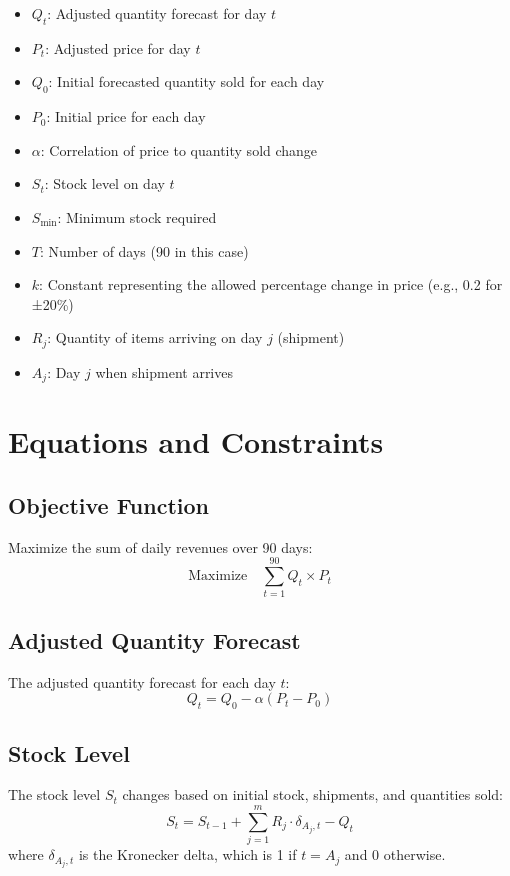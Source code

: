 \documentclass{article}
\begin{document}
\begin{itemize}
  \item $Q_t$: Adjusted quantity forecast for day \( t \)
  \item $P_t$: Adjusted price for day \( t \)
  \item $Q_0$: Initial forecasted quantity sold for each day
  \item $P_0$: Initial price for each day
  \item $\alpha$: Correlation of price to quantity sold change
  \item $S_t$: Stock level on day \( t \)
  \item $S_{\text{min}}$: Minimum stock required
  \item $T$: Number of days (90 in this case)
  \item $k$: Constant representing the allowed percentage change in price (e.g., 0.2 for ±20\%)
  \item $R_j$: Quantity of items arriving on day \( j \) (shipment)
  \item $A_j$: Day \( j \) when shipment arrives
\end{itemize}

\section*{Equations and Constraints}

\subsection*{Objective Function}

Maximize the sum of daily revenues over 90 days:
\[
\text{Maximize} \quad \sum_{t=1}^{90} Q_t \times P_t
\]

\subsection*{Adjusted Quantity Forecast}

The adjusted quantity forecast for each day \( t \):
\[
Q_t = Q_0 - \alpha (P_t - P_0)
\]

\subsection*{Stock Level}

The stock level \( S_t \) changes based on initial stock, shipments, and quantities sold:
\[
S_t = S_{t-1} + \sum_{j=1}^{m} R_j \cdot \delta_{A_j,t} - Q_t
\]
where \( \delta_{A_j,t} \) is the Kronecker delta, which is 1 if \( t = A_j \) and 0 otherwise.
\end{document}
